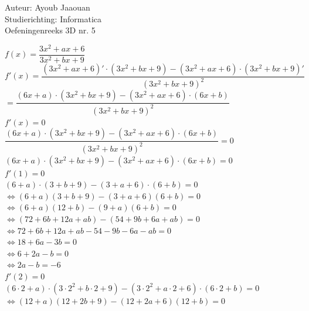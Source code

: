 \documentclass[a4paper]{article}
\begin{document}
\noindent \large Auteur: Ayoub Jaaouan \\
\noindent \large Studierichting: Informatica\\
\noindent \large Oefeningenreeks 3D nr. 5\\

\medskip

\normalsize

$f(x)= \dfrac{3x^2+ax+6}{3x^2+bx+9}$\\

$f'(x)=\dfrac{(3x^2+ax+6)' \cdot (3x^2+bx+9)-(3x^2+ax+6)\cdot(3x^2+bx+9)'}{(3x^2+bx+9)^2}$\\

$= \dfrac{(6x+a)\cdot(3x^2+bx+9)-(3x^2+ax+6)\cdot (6x+b)}{(3x^2+bx+9)^2}$\\

$f'(x)=0$\\

$\dfrac{(6x+a)\cdot(3x^2+bx+9)-(3x^2+ax+6)\cdot (6x+b)}{(3x^2+bx+9)^2}=0$\\

$(6x+a)\cdot(3x^2+bx+9)-(3x^2+ax+6)\cdot (6x+b) = 0$\\

$f'(1)=0$\\

$(6 +a)\cdot(3 +b+9)-(3+a+6)\cdot (6+b)=0$\\

$\Leftrightarrow (6+a)(3+b+9)-(3+a+6)(6+b)=0$\\

$\Leftrightarrow (6+a)(12+b)-(9+a)(6+b)=0$\\

$\Leftrightarrow (72+6b+12a+ab)-(54+9b+6a+ab)=0$\\

$\Leftrightarrow 72+6b+12a+ab-54-9b-6a-ab=0$\\

$\Leftrightarrow 18+6a-3b=0$\\

$\Leftrightarrow 6+2a-b=0$\\

$\Leftrightarrow 2a-b=-6$\\

$f'(2)=0$\\

$(6 \cdot 2 +a)\cdot(3 \cdot 2^2+b\cdot 2+9)-(3\cdot 2^2+a \cdot 2+6)\cdot (6\cdot 2+b)=0$\\

$\Leftrightarrow (12+a)(12+2b+9)-(12+2a+6)(12+b)=0$\\
\end{document}
